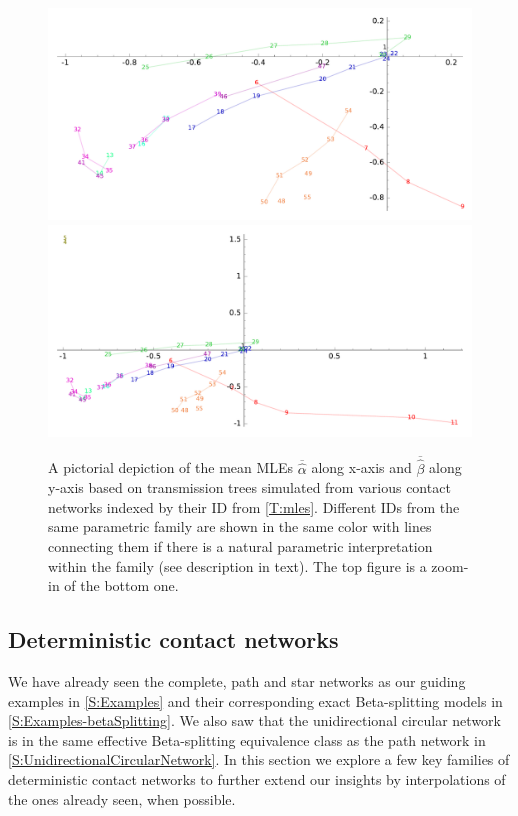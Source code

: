 \documentclass[review]{elsarticle}
\numberwithin{equation}{section}
\let\orgautoref\autoref
\renewcommand{\autoref}
        {\def\equationautorefname{Eq.}%
         \def\figureautorefname{Fig.}%
         \def\subfigureautorefname{Fig.}%
         \def\sectionautorefname{Sect.}%
         \def\subsectionautorefname{Sect.}%
         \def\subsubsectionautorefname{Sect.}%
         \def\Itemautorefname{item}%
         \def\tableautorefname{Table}%
         \def\propositionautorefname{Prop.}%
         \def\corollaryautorefname{Corollary}%
         \def\theoremautorefname{Theorem}%
         \def\remarkautorefname{Remark}%
         \def\lemmaautorefname{Lemma}%
         \def\proofofautorefname{Proof}%
         \def\exampleautorefname{Example}%
         \orgautoref}
\begin{document}
\begin{figure}[htbp]
\begin{center}
\includegraphics[width=0.95\linewidth]{figures/tableIDMLEStdErrZoomed.pdf}\\
\includegraphics[width=0.95\linewidth]{figures/tableIDMLEStdErrZoomedOut.pdf}
\end{center}
\caption{A pictorial depiction of the mean MLEs $\overline{\hat{\alpha}}$ along x-axis and $\overline{\hat{\beta}}$ along y-axis based on transmission trees simulated from various contact networks indexed by their ID from \autoref{T:mles}.  Different IDs from the same parametric family are shown in the same color with lines connecting them if there is a natural parametric interpretation within the family (see description in text).  The top figure is a zoom-in of the bottom one.\label{F:tableIDMLEStdErrZoomed}}
\end{figure}

\subsection{Deterministic contact networks}
We have already seen the complete, path and star networks as our guiding examples in \autoref{S:Examples} and their corresponding exact Beta-splitting models in \autoref{S:Examples-betaSplitting}.  
We also saw that the unidirectional circular network is in the same effective Beta-splitting equivalence class as the path network in \autoref{S:UnidirectionalCircularNetwork}.  
In this section we explore a few key families of deterministic contact networks to further extend our insights by interpolations of the ones already seen, when possible.
\end{document}
